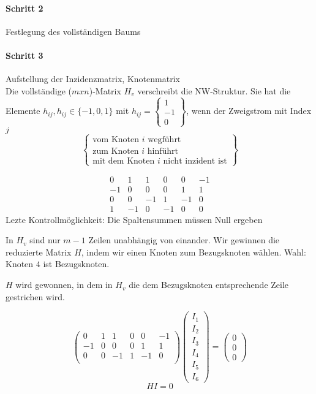 \documentclass[german]{article}
\begin{document}
\paragraph{Schritt 2}
	Festlegung des vollständigen Baums


\paragraph{Schritt 3}
	Aufstellung der Inzidenzmatrix, Knotenmatrix \\
	Die vollständige ($m x n$)-Matrix $H_v$ verschreibt die NW-Struktur. Sie hat die Elemente $h_{ij},
	h_{ij} \in \{-1,0,1\}$ mit $h_{ij} = \left\{ \begin{array}{c}1\\ -1\\ 0 \end{array} \right\}$, wenn der Zweigstrom mit Index $j$
	\[
		\left\{
			\begin{array}{c}
				\text{vom Knoten } i \text{ wegführt}\\
				\text{zum Knoten } i \text{ hinführt}\\
				\text{mit dem Knoten } i \text{ nicht inzident ist}
			\end{array}
		\right\}
	\]

	\[
		\begin{array}{cccccc}
			0 & 1 & 1 & 0 & 0 & -1 \\
			-1 & 0 & 0 & 0 & 1 & 1 \\
			0 & 0 & -1 & 1 & -1 & 0 \\
			1 & -1 & 0 & -1 & 0 & 0
		\end{array}
	\]
	Lezte Kontrollmöglichkeit: Die Spaltensummen müssen Null ergeben

	In $H_v$ sind nur $m-1$ Zeilen unabhängig von einander. Wir gewinnen die reduzierte Matrix $H$, indem wir einen Knoten zum Bezugsknoten wählen. Wahl: Knoten $4$ ist Bezugsknoten.

	$H$ wird gewonnen, in dem in $H_v$ die dem Bezugsknoten entsprechende Zeile gestrichen wird.

	\[
		\left(
		\begin{array}{cccccc}
			0 & 1 & 1 & 0 & 0 & -1 \\
			-1 & 0 & 0 & 0 & 1 & 1 \\
			0 & 0 & -1 & 1 & -1 & 0 \\
		\end{array}
		\right)
		\left(
		\begin{array}{c}
			I_1 \\
			I_2 \\
			I_3 \\
			I_4 \\
			I_5 \\
			I_6
		\end{array}
		\right)
		=
		\left(
		\begin{array}{c}
			0 \\
			0 \\
			0
		\end{array}
		\right)
	\]
	\[
		HI = 0
	\]
\end{document}
